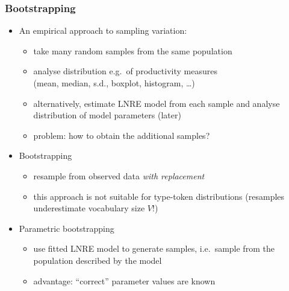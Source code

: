 \documentclass[t]{beamer} %
\begin{document}
\begin{frame}
  \frametitle{Bootstrapping}

  \begin{itemize}
  \item<1-> An empirical approach to sampling variation:
    \begin{itemize}
    \item take many random samples from the same population
    \item analyse distribution e.g.\ of productivity measures\\
      (mean, median, s.d., boxplot, histogram, \ldots)
    \item alternatively, estimate LNRE model from each sample
      and analyse distribution of model parameters (\so later)
    \item problem: how to obtain the additional samples?
    \end{itemize}
  \item<2-> Bootstrapping \citep{Efron:79}
    \begin{itemize}
    \item resample from observed data \emph{with replacement}
    \item this approach is not suitable for type-token distributions
      (resamples underestimate vocabulary size $V$!)
    \end{itemize}
  \item<3-> Parametric bootstrapping
    \begin{itemize}
    \item use fitted LNRE model to generate samples, i.e.\ sample from the population described by the model
    \item advantage: ``correct'' parameter values are known
    \end{itemize}
  \end{itemize}
\end{frame}
\end{document}
